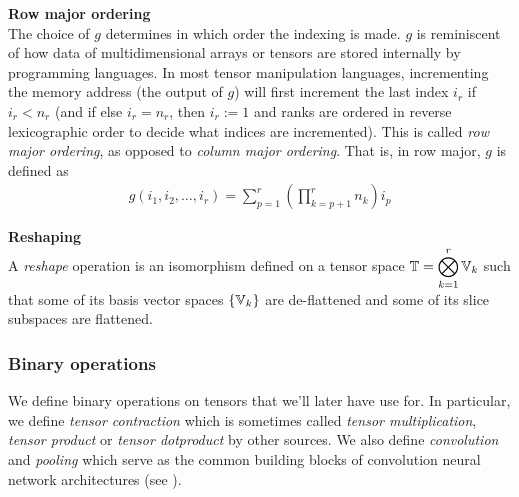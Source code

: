 \begin{remark}\textbf{Row major ordering}\\
The choice of $g$ determines in which order the indexing is made. $g$ is reminiscent of how data of multidimensional arrays or tensors are stored internally by programming languages. In most tensor manipulation languages, incrementing the memory address (\ie the output of $g$) will first increment the last index $i_r$ if $i_r < n_r$ (and if else $i_r = n_r$, then $i_r := 1$ and ranks are ordered in reverse lexicographic order to decide what indices are incremented). This is called \emph{row major ordering}, as opposed to \emph{column major ordering}. That is, in row major, $g$ is defined as
\begin{align}
  g(i_1, i_2, \ldots, i_r) = \displaystyle \sum_{p=1}^r \left( \prod_{k=p+1}^r n_k \right) i_p \label{eq:rowmajor}
\end{align}
\end{remark}

\begin{definition}\textbf{Reshaping}\\
A \emph{reshape} operation is an isomorphism defined on a tensor space $\mathbb{T} = \displaystyle \bigotimes_{k=1}^r \mathbb{V}_k$ such that some of its basis vector spaces $\{\mathbb{V}_k\}$ are de-flattened and some of its slice subspaces are flattened.
\end{definition}

\subsubsection{Binary operations}

We define binary operations on tensors that we'll later have use for. In particular, we define  \emph{tensor contraction} which is sometimes called \emph{tensor multiplication}, \emph{tensor product} or \emph{tensor dotproduct} by other sources. We also define \emph{convolution} and \emph{pooling} which serve as the common building blocks of convolution neural network architectures (see ).

